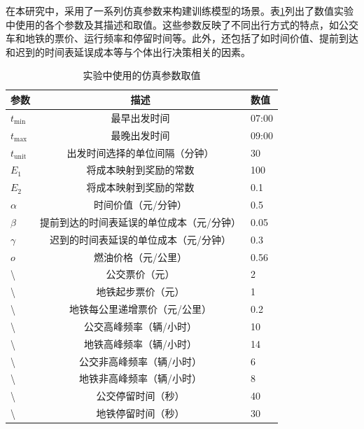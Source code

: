 在本研究中，采用了一系列仿真参数来构建训练模型的场景。表\ref{public}列出了数值实验中使用的各个参数及其描述和取值。这些参数反映了不同出行方式的特点，如公交车和地铁的票价、运行频率和停留时间等。此外，还包括了如时间价值、提前到达和迟到的时间表延误成本等与个体出行决策相关的因素。
\renewcommand{\arraystretch}{1.2}
\setlength{\tabcolsep}{8mm}
\begin{table}[htbp]
\centering
\caption{实验中使用的仿真参数取值}
\label{public}
\begin{tabular}{lcl}
\toprule
参数 & 描述                                                 & 数值 \\ 
\midrule
$t_\text{min}$  & 最早出发时间                                     & 07:00 \\
$t_\text{max}$  & 最晚出发时间                                     & 09:00 \\
$t_\text{unit}$  & 出发时间选择的单位间隔（分钟）                   & 30    \\
$E_1$  & 将成本映射到奖励的常数                               & 100   \\
$E_2$  & 将成本映射到奖励的常数                               & 0.1   \\
$\alpha$  & 时间价值（元/分钟）                               & 0.5   \\
$\beta$  & 提前到达的时间表延误的单位成本（元/分钟）           & 0.05  \\
$\gamma$  & 迟到的时间表延误的单位成本（元/分钟）             & 0.3   \\
$o$  & 燃油价格（元/公里）                                 & 0.56  \\
\textbackslash{}  & 公交票价（元）                             & 2     \\
\textbackslash{}  & 地铁起步票价（元）                         & 1     \\
\textbackslash{}  & 地铁每公里递增票价（元/公里）               & 0.2   \\
\textbackslash{}  & 公交高峰频率（辆/小时）                      & 10    \\
\textbackslash{}  & 地铁高峰频率（辆/小时）                      & 14    \\
\textbackslash{}  & 公交非高峰频率（辆/小时）                    & 6     \\
\textbackslash{}  & 地铁非高峰频率（辆/小时）                    & 8     \\
\textbackslash{}  & 公交停留时间（秒）                           & 40    \\
\textbackslash{}  & 地铁停留时间（秒）                           & 30    \\ 
\bottomrule
\end{tabular}
\end{table}



